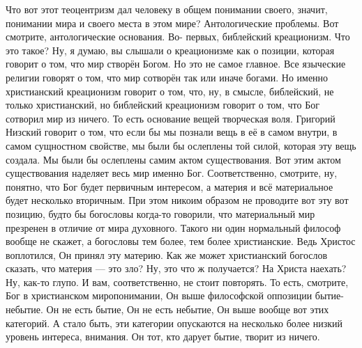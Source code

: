 Что вот этот теоцентризм
дал человеку в общем понимании своего, значит, понимании мира и своего места в
этом мире? Антологические проблемы. Вот смотрите, антологические основания. Во-
первых, библейский креационизм. Что это такое? Ну, я думаю, вы слышали о
креационизме как о позиции, которая говорит о том, что мир створён Богом. Но это
не самое главное. Все языческие религии говорят о том, что мир сотворён так или
иначе богами. Но именно христианский креационизм говорит о том, что, ну, в
смысле, библейский, не только христианский, но библейский креационизм говорит о
том, что Бог сотворил мир из ничего. То есть основание вещей творческая воля.
Григорий Низский говорит о том, что если бы мы познали вещь в её в самом внутри,
в самом сущностном свойстве, мы были бы ослеплены той силой, которая эту вещь
создала. Мы были бы ослеплены самим актом существования. Вот этим актом
существования наделяет весь мир именно Бог. Соответственно, смотрите, ну,
понятно, что Бог будет первичным интересом, а материя и всё материальное будет
несколько вторичным. При этом никоим образом не проводите вот эту вот позицию,
будто бы богословы когда-то говорили, что материальный мир презренен в отличие
от мира духовного. Такого ни один нормальный философ вообще не скажет, а
богословы тем более, тем более христианские. Ведь Христос воплотился, Он принял
эту материю. Как же может христианский богослов сказать, что материя — это зло?
Ну, это что ж получается? На Христа наехать? Ну, как-то глупо. И вам,
соответственно, не стоит повторять. То есть, смотрите, Бог в христианском
миропонимании, Он выше философской оппозиции бытие-небытие. Он не есть бытие, Он
не есть небытие, Он выше вообще вот этих категорий. А стало быть, эти категории
опускаются на несколько более низкий уровень интереса, внимания. Он тот, кто
дарует бытие, творит из ничего. 

